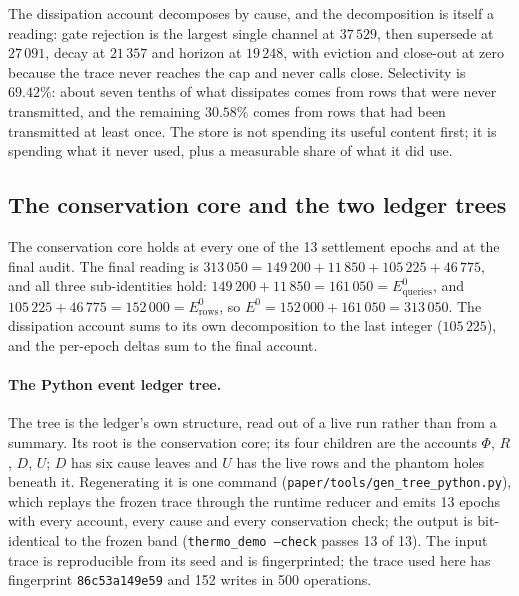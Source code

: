 \documentclass[11pt,a4paper]{article}
\newcommand{\Ezero}{E^{0}}
\begin{document}
The dissipation account decomposes by cause, and the decomposition is itself a reading: gate rejection is the largest single channel at $37\,529$, then supersede at $27\,091$, decay at $21\,357$ and horizon at $19\,248$, with eviction and close-out at zero because the trace never reaches the cap and never calls close. Selectivity is $69.42\%$: about seven tenths of what dissipates comes from rows that were never transmitted, and the remaining $30.58\%$ comes from rows that had been transmitted at least once. The store is not spending its useful content first; it is spending what it never used, plus a measurable share of what it did use.

\subsection{The conservation core and the two ledger trees}
\label{sec:trees}
The conservation core holds at every one of the 13 settlement epochs and at the final audit. The final reading is $313\,050 = 149\,200 + 11\,850 + 105\,225 + 46\,775$, and all three sub-identities hold: $149\,200 + 11\,850 = 161\,050 = \Ezero_{\mathrm{queries}}$, and $105\,225 + 46\,775 = 152\,000 = \Ezero_{\mathrm{rows}}$, so $\Ezero = 152\,000 + 161\,050 = 313\,050$. The dissipation account sums to its own decomposition to the last integer ($105\,225$), and the per-epoch deltas sum to the final account.

\paragraph{The Python event ledger tree.}
The tree is the ledger's own structure, read out of a live run rather than from a summary. Its root is the conservation core; its four children are the accounts $\Phi$, $R$, $D$, $U$; $D$ has six cause leaves and $U$ has the live rows and the phantom holes beneath it. Regenerating it is one command (\texttt{paper/tools/gen\_tree\_python.py}), which replays the frozen trace through the runtime reducer and emits 13 epochs with every account, every cause and every conservation check; the output is bit-identical to the frozen band (\texttt{thermo\_demo --check} passes 13 of 13). The input trace is reproducible from its seed and is fingerprinted; the trace used here has fingerprint \texttt{86c53a149e59} and 152 writes in 500 operations.
\end{document}
